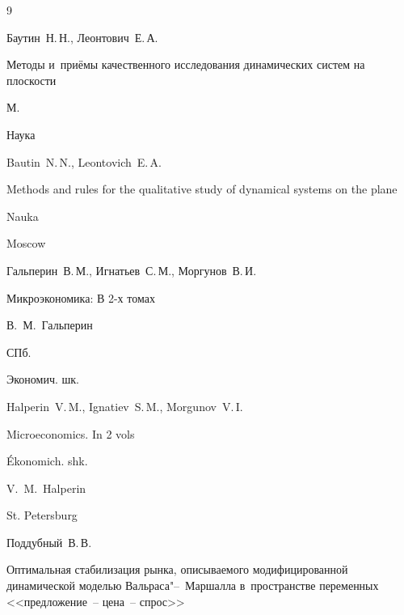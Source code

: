 \begin{thebibliography}{9}




\by Баутин~Н.\,Н., Леонтович~Е.\,А. 

\book Методы и~приёмы качественного исследования динамических систем на плоскости

\publaddr М.

\publ Наука



\misctransl

\by Bautin~N.\,N., Leontovich~E.\,A. 

\book Methods and rules for the qualitative study of dynamical systems on the plane

\publaddr Nauka

\publ Moscow






\by Гальперин~В.\,М., Игнатьев~С.\,М., Моргунов~В.\,И.

\book Микроэкономика: В 2-х томах 


\ed В.~М.~Гальперин

\publaddr СПб.

\publ Экономич. шк.



\misctransl

\by Halperin~V.\,M., Ignatiev~S.\,M., Morgunov~V.\,I.

\book Microeconomics. In 2 vols

\publ \'Ekonomich. shk.

\ed V.~M.~Halperin


\publaddr St. Petersburg










\by Поддубный~В.\,В. 

\paper Оптимальная стабилизация рынка, описываемого модифицированной динамической моделью Вальраса"--~Маршалла в~пространстве переменных <<предложение~-- цена~-- спрос>> 


\end{thebibliography}
